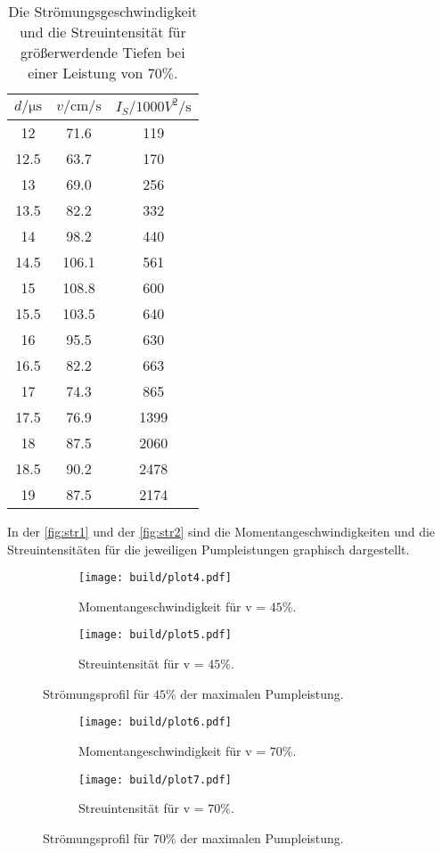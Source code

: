 \begin{table}[H]
    \centering
    \caption{Die Strömungsgeschwindigkeit und die Streuintensität für größerwerdende Tiefen bei einer Leistung von $70 \%$.}
    \label{tab:sp2}
\begin{tabular}{c c c}
    \toprule
    $d / \si{\micro\second}$ & $ v / \si{\centi \meter \per \second}$ & $I_S / 1000 \si{ V^2 \per \second} $\\
    \midrule
      12 &   71.6 &  119 \\
    12.5 &   63.7 &  170 \\
      13 &   69.0 &  256 \\
    13.5 &  82.2 &  332 \\
      14 &  98.2 &  440 \\
    14.5 &  106.1 &  561 \\
      15 &  108.8 &  600 \\
    15.5 &  103.5 &  640 \\
      16 &  95.5 &  630 \\
    16.5 &  82.2 &  663 \\
      17 &  74.3 &  865 \\
    17.5 &  76.9 &  1399 \\
      18 &  87.5 &  2060 \\
    18.5 &  90.2 & 2478 \\
      19 &  87.5 & 2174 \\
    \bottomrule
    \end{tabular}
\end{table}

In der \autoref{fig:str1} und der \autoref{fig:str2} sind die Momentangeschwindigkeiten und die Streuintensitäten für die jeweiligen
Pumpleistungen graphisch dargestellt.


\begin{figure}
  \begin{subfigure}{0.48\textwidth}
    \centering
    \texttt{[image: build/plot4.pdf]}
    \caption{Momentangeschwindigkeit für v = $45\%$.}
    \label{fig:plot4}
  \end{subfigure}
  \hfill
  \begin{subfigure}{0.48\textwidth}
    \centering
    \texttt{[image: build/plot5.pdf]}
    \caption{Streuintensität für v = $45\%$.}
    \label{fig:plot5}
  \end{subfigure}
  \caption{Strömungsprofil für $45\%$ der maximalen Pumpleistung.}
  \label{fig:str1}
\end{figure}

\begin{figure}
  \begin{subfigure}{0.48\textwidth}
    \centering
    \texttt{[image: build/plot6.pdf]}
    \caption{Momentangeschwindigkeit für v = $70\%$.}
    \label{fig:plot6}
  \end{subfigure}
  \hfill
  \begin{subfigure}{0.48\textwidth}
    \centering
    \texttt{[image: build/plot7.pdf]}
    \caption{Streuintensität für v = $70\%$.}
    \label{fig:plot7}
  \end{subfigure}
  \caption{Strömungsprofil für $70\%$ der maximalen Pumpleistung.}
  \label{fig:str2}
\end{figure}
